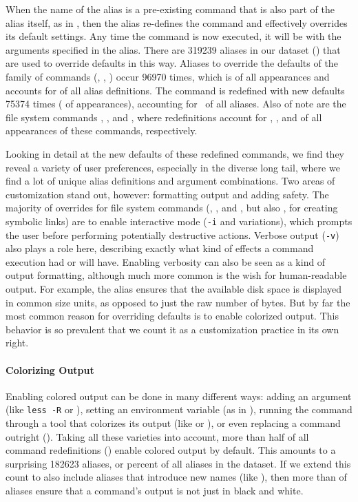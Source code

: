 When the name of the alias is a pre-existing command that is also part of the alias itself, as in , then the alias re-defines the command and effectively overrides its default settings.
Any time the command is now executed, it will be with the arguments specified in the alias.
There are \num{319239} aliases in our dataset () that are used to override defaults in this way.
Aliases to override the defaults of the  family of commands (, , ) occur \num{96970} times, which is  of all  appearances and accounts for  of all alias definitions.
The  command is redefined with new defaults \num{75374} times ( of  appearances), accounting for  of all aliases.
Also of note are the file system commands , , and , where redefinitions account for , , and  of all appearances of these commands, respectively.

Looking in detail at the new defaults of these redefined commands, we find they reveal a variety of user preferences, especially in the diverse long tail, where we find a lot of unique alias definitions and argument combinations.
Two areas of customization stand out, however: formatting output and adding safety.
The majority of overrides for file system commands (, , and , but also , for creating symbolic links) are to enable interactive mode (\texttt{-i} and variations), which prompts the user before performing potentially destructive actions.
Verbose output (\texttt{-v}) also plays a role here, describing exactly what kind of effects a command execution had or will have.
Enabling verbosity can also be seen as a kind of output formatting, although much more common is the wish for human-readable output.
For example, the alias  ensures that the available disk space is displayed in common size units, as opposed to just the raw number of bytes.
But by far the most common reason for overriding defaults is to enable colorized output.
This behavior is so prevalent that we count it as a customization practice in its own right.

\paragraph{\bf Colorizing Output}

Enabling colored output can be done in many different ways: adding an argument (like \texttt{less -R} or ), setting an environment variable (as in ), running the command through a tool that colorizes its output (like  or ), or even replacing a command outright ().
Taking all these varieties into account, more than half of all command redefinitions () enable colored output by default.
This amounts to a surprising \num{182623} aliases, or  percent of all aliases in the dataset.
If we extend this count to also include aliases that introduce new names (like ), then more than  of aliases ensure that a command's output is not just in black and white.

